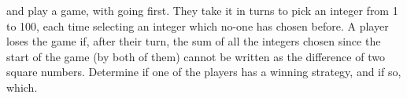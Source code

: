  and  play a game, with  going first. They take it in turns to pick an integer from 1 to 100, each time selecting an integer which no-one has chosen before. A player loses the game if, after their turn, the sum of all the integers chosen since the start of the game (by both of them) cannot be written as the difference of two square numbers. Determine if one of the players has a winning strategy, and if so, which.